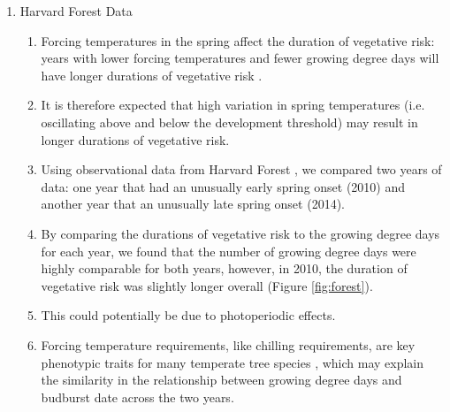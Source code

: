 \documentclass{article}\usepackage[]{graphicx}\usepackage[]{color}
\begin{document}
\begin{enumerate}
\item Harvard Forest Data
\begin{enumerate}
\item Forcing temperatures in the spring affect the duration of vegetative risk: years with lower forcing temperatures and fewer growing degree days will have longer durations of vegetative risk \citep{Donnelly2017}.
\item It is therefore expected that high variation in spring temperatures (i.e. oscillating above and below the development threshold) may result in longer durations of vegetative risk.
\item Using observational data from Harvard Forest \citep{Okeefe2014}, we compared two years of data: one year that had an unusually early spring onset (2010) and another year that an unusually late spring onset (2014).
\item By comparing the durations of vegetative risk to the growing degree days for each year, we found that the number of growing degree days were highly comparable for both years, however, in 2010, the duration of vegetative risk was slightly longer overall (Figure \ref{fig:forest}). 
\item This could potentially be due to photoperiodic effects.
\item Forcing temperature requirements, like chilling requirements, are key phenotypic traits for many temperate tree species \citep{Kramer2017}, which may explain the similarity in the relationship between growing degree days and budburst date across the two years. 
\end{enumerate}
\end {enumerate}


\end{document}
